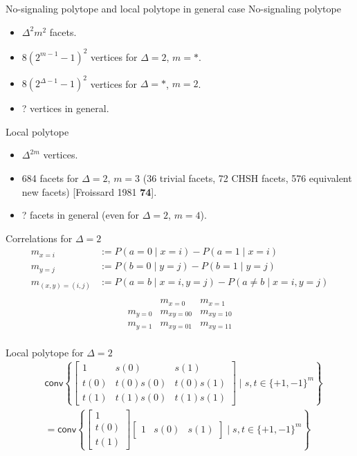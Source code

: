 \documentclass{beamer}
\newcommand\emm[1]{\textcolor{redorange}{{#1}}}
\newcommand\numc[1]{\textcolor{citation}{{\bf #1}}}
\begin{document}
\begin{frame}{No-signaling polytope and local polytope in general case}
No-signaling polytope
\begin{itemize}
\item $\Delta^2m^2$ facets.
\item $8(2^{m-1}-1)^2$ vertices for $\Delta=2$, $m=*$.
\item $8(2^{\Delta-1}-1)^2$ vertices for $\Delta=*$, $m=2$.
\item \emm{?} vertices in general.
\end{itemize}

\vspace{2em}
Local polytope
\begin{itemize}
\item $\Delta^{2m}$ vertices.
\item 684 facets for $\Delta=2$, $m=3$ (36 trivial facets, 72 CHSH facets, 576 equivalent \emm{new facets}) [Froissard 1981 \numc{74}].
\item \emm{?} facets in general (even for $\Delta=2$, $m=4$).
\end{itemize}
\end{frame}

\begin{frame}{Correlations for $\Delta=2$}
\begin{align*}
m_{x=i} &:= P(a=0\mid x=i) - P(a=1\mid x=i)\\
m_{y=j} &:= P(b=0\mid y=j) - P(b=1\mid y=j)\\
m_{(x,y)=(i,j)} &:= P(a=b\mid x=i, y=j) - P(a\ne b\mid x=i, y=j)\\
\end{align*}
\begin{equation*}
\begin{matrix}
& m_{x=0} & m_{x=1}\\
m_{y=0} & m_{xy=00} & m_{xy=10}\\
m_{y=1} & m_{xy=01} & m_{xy=11}\\
\end{matrix}
\end{equation*}
\end{frame}

\begin{frame}{Local polytope for $\Delta=2$}
\begin{align*}
&\mathsf{conv}\left\{
\begin{bmatrix}
1&s(0)&s(1)\\
t(0)&t(0)s(0)&t(0)s(1)\\
t(1)&t(1)s(0)&t(1)s(1)
\end{bmatrix}
\mid
s,t\in\{+1,-1\}^m
\right\}\\
&=
\mathsf{conv}\left\{
\begin{bmatrix}
1\\
t(0)\\
t(1)
\end{bmatrix}
\begin{bmatrix}
1&
s(0)&
s(1)
\end{bmatrix}
\mid
s,t\in\{+1,-1\}^m
\right\}\\
\end{align*}
\end{frame}
\end{document}
